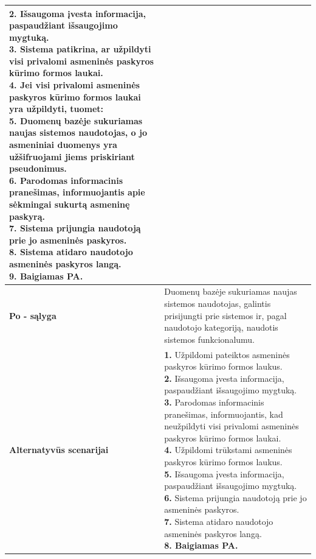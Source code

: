 \documentclass[12pt]{article}
\begin{document}
\begin{table}[htb!]
\begin{tabular}{|m{2.9cm}|m{14.3cm}|}
{{            \textbf{2.} \textcolor{dartmouthgreen}{Išsaugoma įvesta
            informacija, paspaudžiant išsaugojimo mygtuką.} \\
            \textbf{3.} Sistema patikrina, ar užpildyti visi privalomi asmeninės
            paskyros kūrimo formos laukai.
            \\
            \textbf{4.} {Jei visi privalomi asmeninės paskyros kūrimo formos
            laukai yra užpildyti, tuomet:} \\
            \textbf{5.} {Duomenų bazėje sukuriamas naujas sistemos naudotojas, o
            jo asmeniniai duomenys yra užšifruojami jiems priskiriant
            pseudonimus.} \\
            \textbf{6.} {Parodomas informacinis
            pranešimas, informuojantis apie sėkmingai sukurtą asmeninę
            paskyrą.} \\
            \textbf{7.} {Sistema prijungia naudotoją prie jo asmeninės
            paskyros.} \\
            \textbf{8.} {Sistema atidaro naudotojo asmeninės paskyros langą.} \\
            \textbf{9. Baigiamas PA.}
        }}
        \\
        \hline
        \raggedleft \textbf{\cellcolor{deepchampagne}Po - sąlyga} &
        Duomenų bazėje sukuriamas naujas sistemos naudotojas, galintis
        prisijungti prie sistemos ir, pagal naudotojo kategoriją, naudotis
        sistemos funkcionalumu. \\
        \hline
        \raggedleft \textbf{\cellcolor{deepchampagne}Alternatyvūs scenarijai} &
        \vskip 5pt
        \makecell[l]{\parbox[t]{13.7cm}{
            \textbf{1.} \textcolor{dartmouthgreen}{Užpildomi pateiktos
            asmeninės paskyros kūrimo formos laukus.} \\
            \textbf{2.} \textcolor{dartmouthgreen}{Išsaugoma įvesta
            informacija, paspaudžiant išsaugojimo mygtuką.} \\
            \textbf{3.} Parodomas informacinis pranešimas, informuojantis, kad
            neužpildyti visi privalomi asmeninės paskyros kūrimo formos
            laukai. \\
            \textbf{4.} \textcolor{dartmouthgreen}{Užpildomi trūkstami
            asmeninės paskyros kūrimo formos laukus.} \\
            \textbf{5.} \textcolor{dartmouthgreen}{Išsaugoma įvesta
            informacija, paspaudžiant išsaugojimo mygtuką.} \\
            \textbf{6.} {Sistema prijungia naudotoją prie jo asmeninės
            paskyros.} \\
            \textbf{7.} {Sistema atidaro naudotojo asmeninės paskyros langą.} \\
            \textbf{8. Baigiamas PA.}
        }}
        \\
        \hline
    \end{tabular}
\end{table}
\end{document}
